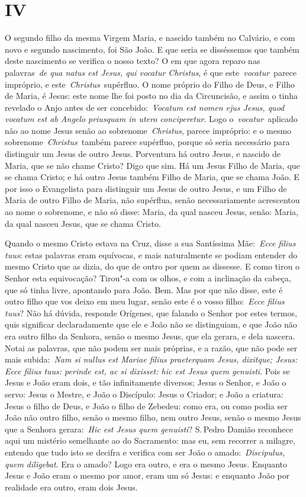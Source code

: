 \section{IV}

O segundo filho da mesma Virgem Maria, e nascido também no
Calvário, e com novo e segundo nascimento, foi São João. E que seria se
disséssemos que também deste nascimento se verifica o nosso texto? O em
que agora reparo nas palavras~\emph{de qua natus est Jesus, qui vocatur
Christus}, é que este~\emph{vocatur}~parece impróprio, e
este~\emph{Christus}~supérfluo. O nome próprio do Filho de Deus, e Filho
de Maria, é Jesus: este nome lhe foi posto no dia da Circuncisão, e
assim o tinha revelado o Anjo antes de ser concebido:~\emph{Vocatum est
nomen ejus Jesus, quod vocatum est ab Angelo priusquam in utero
conciperetur}. Logo o~\emph{vocatur}~aplicado não ao
nome Jesus senão ao sobrenome~\emph{Christus}, parece impróprio: e o
mesmo sobrenome~\emph{Christus}~também parece supérfluo, porque só seria
necessário para distinguir um Jesus de outro Jesus. Porventura há outro
Jesus, e nascido de Maria, que se não chame Cristo? Digo que sim. Há um
Jesus Filho de Maria, que se chama Cristo; e há outro Jesus também Filho
de Maria, que se chama João. E por isso o Evangelista para distinguir um
Jesus de outro Jesus, e um Filho de Maria de outro Filho de Maria, não
supérflua, senão necessariamente acrescentou ao nome o sobrenome, e não
só disse: Maria, da qual nasceu Jesus, senão: Maria, da qual nasceu
Jesus, que se chama Cristo.


Quando o mesmo Cristo estava na Cruz, disse a sua Santíssima
Mãe:~\emph{Ecce filius tuus}: estas palavras eram
equívocas, e mais naturalmente se podiam entender do mesmo Cristo que as
dizia, do que de outro por quem as dissesse. E como tirou o Senhor esta
equivocação? Tirou"-a com os olhos, e com a inclinação da cabeça, que só
tinha livre, apontando para João. Bem. Mas por que não disse, este é
outro filho que vos deixo em meu lugar, senão este é o vosso
filho:~\emph{Ecce filius tuus}? Não há dúvida, responde Orígenes, que
falando o Senhor por estes termos, quis significar declaradamente que
ele e João não se distinguiam, e que João não era outro filho da
Senhora, senão o mesmo Jesus, que ela gerara, e dela nascera. Notai as
palavras, que não podem ser mais próprias, e a razão, que não pode ser
mais subida:~\emph{Nam si nullus est Mariae filius praeterquam Jesus,
dixitque; Jesus: Ecce filius tuus: perinde est, ac si dixisset: hic est
Jesus quem genuisti}. Pois se Jesus e João eram dois,
e tão infinitamente diversos; Jesus o Senhor, e João o servo: Jesus o
Mestre, e João o Discípulo: Jesus o Criador; e João a criatura: Jesus o
filho de Deus, e João o filho de Zebedeu: como era, ou como podia ser
João não outro filho, senão o mesmo filho, nem outro Jesus, senão o
mesmo Jesus que a Senhora gerara:~\emph{Hic est Jesus quem genuisti}? S.\,Pedro Damião reconhece aqui um mistério semelhante ao do Sacramento: mas
eu, sem recorrer a milagre, entendo que tudo isto se decifra e verifica
com ser João o amado:~\emph{Discipulus, quem
diligebat}. Era o amado? Logo era outro, e era o mesmo
Jesus. Enquanto Jesus e João eram o mesmo por amor, eram um só Jesus: e
enquanto João por realidade era outro, eram dois Jesus.


